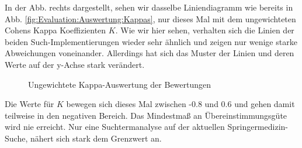 \begin{minipage}{0.4\linewidth}
In der Abb. rechts dargestellt, sehen wir dasselbe Liniendiagramm wie bereits in Abb. \ref{fig:Evaluation:Auswertung:Kappas}, nur dieses Mal mit dem ungewichteten Cohens Kappa Koeffizienten $K$. Wie wir hier sehen, verhalten sich die Linien der beiden Such-Implementierungen wieder sehr ähnlich und zeigen nur wenige starke Abweichungen voneinander. Allerdings hat sich das Muster der Linien und deren Werte auf der y-Achse stark verändert. 
\end{minipage}
\hfill
\begin{minipage}{0.55\linewidth}
\begin{figure}[H]
\centering 
\vspace{-2em}
\caption[Ungewichtete Kappa-Auswertung der Bewertungen]{Ungewichtete Kappa-Auswertung der Bewertungen} 
\label{fig:Evaluation:Auswertung:KappasUnweighted}

\footnotesize
{}\kappas
\pgfsetplotmarksize{.5pt}
  

\vspace{-1em}
\end{figure}
\end{minipage}

Die Werte für $K$ bewegen sich dieses Mal zwischen -0.8 und 0.6 und gehen damit teilweise in den negativen Bereich. Das Mindestmaß an Übereinstimmungsgüte wird nie erreicht. Nur eine Suchtermanalyse auf der aktuellen Springermedizin-Suche, nähert sich stark dem Grenzwert an. 